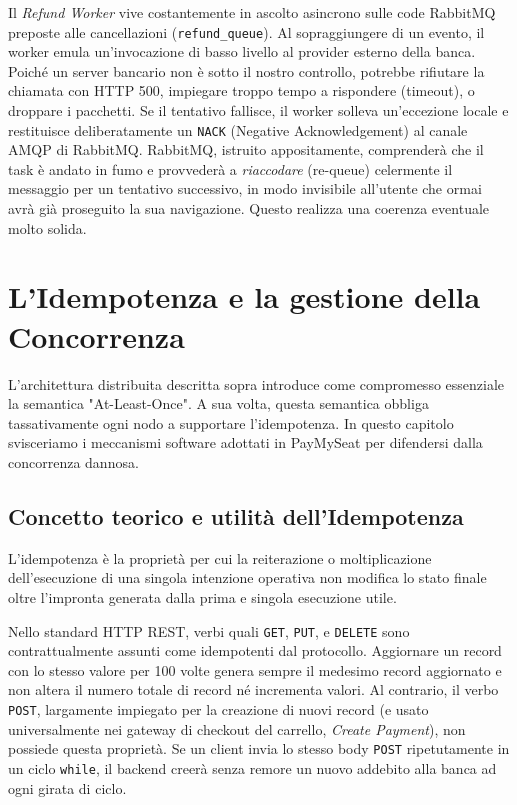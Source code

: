 \documentclass[11pt,a4paper]{report}
\begin{document}
Il \textit{Refund Worker} vive costantemente in ascolto asincrono sulle code RabbitMQ preposte alle cancellazioni (\texttt{refund\_queue}). Al sopraggiungere di un evento, il worker emula un'invocazione di basso livello al provider esterno della banca. Poich\'e un server bancario non \`e sotto il nostro controllo, potrebbe rifiutare la chiamata con HTTP 500, impiegare troppo tempo a rispondere (timeout), o droppare i pacchetti. 
Se il tentativo fallisce, il worker solleva un'eccezione locale e restituisce deliberatamente un \texttt{NACK} (Negative Acknowledgement) al canale AMQP di RabbitMQ. RabbitMQ, istruito appositamente, comprender\`a che il task \`e andato in fumo e provveder\`a a \textit{riaccodare} (re-queue) celermente il messaggio per un tentativo successivo, in modo invisibile all'utente che ormai avr\`a gi\`a proseguito la sua navigazione. Questo realizza una coerenza eventuale molto solida.

\chapter{L'Idempotenza e la gestione della Concorrenza}

L'architettura distribuita descritta sopra introduce come compromesso essenziale la semantica "At-Least-Once". A sua volta, questa semantica obbliga tassativamente ogni nodo a supportare l'idempotenza. In questo capitolo svisceriamo i meccanismi software adottati in PayMySeat per difendersi dalla concorrenza dannosa.

\section{Concetto teorico e utilit\`a dell'Idempotenza}
L'idempotenza \`e la propriet\`a per cui la reiterazione o moltiplicazione dell'esecuzione di una singola intenzione operativa non modifica lo stato finale oltre l'impronta generata dalla prima e singola esecuzione utile. 

Nello standard HTTP REST, verbi quali \texttt{GET}, \texttt{PUT}, e \texttt{DELETE} sono contrattualmente assunti come idempotenti dal protocollo. Aggiornare un record con lo stesso valore per 100 volte genera sempre il medesimo record aggiornato e non altera il numero totale di record n\'e incrementa valori.
Al contrario, il verbo \texttt{POST}, largamente impiegato per la creazione di nuovi record (e usato universalmente nei gateway di checkout del carrello, \textit{Create Payment}), non possiede questa propriet\`a. Se un client invia lo stesso body \texttt{POST} ripetutamente in un ciclo \texttt{while}, il backend creer\`a senza remore un nuovo addebito alla banca ad ogni girata di ciclo.
\end{document}
